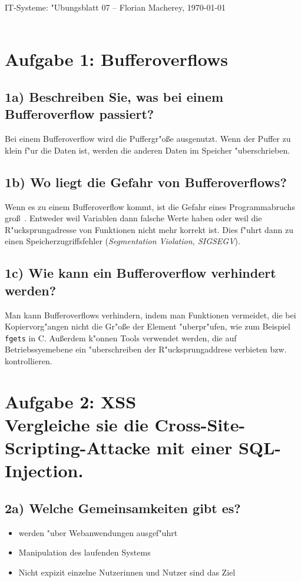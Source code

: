 \documentclass{scrartcl}
\begin{document}
{\Large \centering \textsf{IT-Systeme: "Ubungsblatt 07} -- Florian Macherey, 
\today}\\
\noindent\makebox[\linewidth]{\rule{\textwidth}{0.2pt}} \\


\section*{Aufgabe 1: Bufferoverflows}
\subsection*{1a) Beschreiben Sie, was bei einem Bufferoverflow passiert?}
Bei einem Bufferoverflow wird die Puffergr"o\ss e ausgenutzt. Wenn der Puffer zu 
klein f"ur die Daten ist, werden die anderen Daten im Speicher "uberschrieben.

\subsection*{1b) Wo liegt die Gefahr von Bufferoverflows?} 
Wenn es zu einem Bufferoverflow kommt, ist die Gefahr eines Programmabruchs 
gro\ss ~. Entweder weil Variablen dann falsche Werte haben oder weil die 
R"ucksprungadresse von Funktionen nicht mehr korrekt ist. Dies f"uhrt dann zu 
einen Speicherzugriffsfehler (\textit{Segmentation Violation, SIGSEGV}). 

\subsection*{1c) Wie kann ein Bufferoverflow verhindert werden?}
Man kann Bufferoverflows verhindern, indem man Funktionen vermeidet, die bei 
Kopiervorg"angen nicht die Gr"o\ss e der Element "uberpr"ufen, wie zum Beispiel 
\texttt{fgets} in C. Au\ss erdem k"onnen Tools verwendet werden, die auf 
Betriebssyemebene ein "uberschreiben der R"ucksprungaddrese verbieten bzw. 
kontrollieren.

\section*{Aufgabe 2: XSS \\Vergleiche sie die Cross-Site-Scripting-Attacke mit einer SQL-Injection.}
\subsection*{2a) Welche Gemeinsamkeiten gibt es?}
\begin{itemize}
\item werden "uber Webanwendungen ausgef"uhrt
\item Manipulation des laufenden Systems 
\item Nicht expizit einzelne Nutzerinnen und Nutzer sind das Ziel
\end{itemize}
\end{document}
